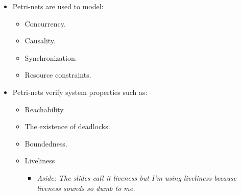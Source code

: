 \documentclass{article}
\begin{document}
\begin{itemize}
\begin{itemize}
\begin{itemize}
			\item Also don't think we really need to know these.
		\end{itemize}
		\item Petri-nets.
		\begin{itemize}
			\item TLDR; See SFWRENG-3BB4.
			\item We do need to know these.
		\end{itemize}
	\end{itemize}
	\item Petri-nets are used to model:
	\begin{itemize}
		\item Concurrency.
		\item Causality.
		\item Synchronization.
		\item Resource constraints.
	\end{itemize}
	\item Petri-nets verify system properties such as:
	\begin{itemize}
		\item Reachability.
		\item The existence of deadlocks.
		\item Boundedness.
		\item Liveliness
		\begin{itemize}
			\item \emph{Aside: The slides call it liveness but I'm using liveliness because liveness sounds so dumb to me.}
		\end{itemize}
	\end{itemize}
\end{itemize}

\ifdefined\iscombined
	\newpage
\else
	
\end{document}
